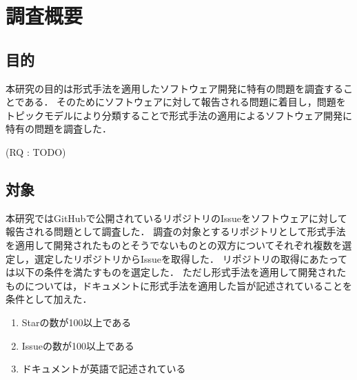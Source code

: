 \documentclass[main]{subfiles}
\begin{document}
\chapter{調査概要}

\section{目的}

本研究の目的は形式手法を適用したソフトウェア開発に特有の問題を調査することである．
そのためにソフトウェアに対して報告される問題に着目し，問題をトピックモデルにより分類することで形式手法の適用によるソフトウェア開発に特有の問題を調査した．

(RQ : TODO)

\section{対象}

本研究ではGitHubで公開されているリポジトリのIssueをソフトウェアに対して報告される問題として調査した．
調査の対象とするリポジトリとして形式手法を適用して開発されたものとそうでないものとの双方についてそれぞれ複数を選定し，選定したリポジトリからIssueを取得した．
リポジトリの取得にあたっては以下の条件を満たすものを選定した．
ただし形式手法を適用して開発されたものについては，ドキュメントに形式手法を適用した旨が記述されていることを条件として加えた．

\begin{enumerate}
	\item Starの数が100以上である
	\item Issueの数が100以上である
	\item ドキュメントが英語で記述されている
\end{enumerate}

\cite{hall:2001}
\end{document}

